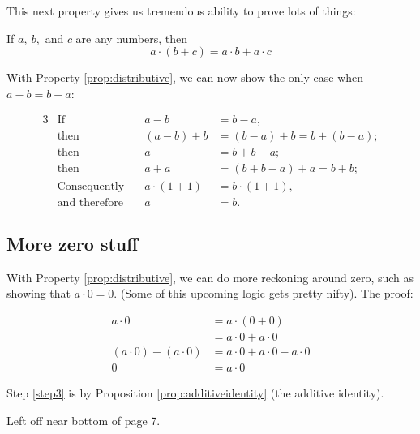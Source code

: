 This next property gives us tremendous ability to prove lots of things:

\begin{property}\label{prop:distributive}
    If $a,~b,$ and $c$ are any numbers, then 
    $$
    a \cdot (b + c) = a \cdot b + a \cdot c
    $$
\end{property}


With Property \ref{prop:distributive}, we can now show the only case when $a - b = b-a$:

\begin{alignat*}{3}
    &\text{If}\quad& a - b &= b - a, \\
    & \text{then}\quad& (a-b) + b &= (b-a) + b = b + (b-a);\\
    & \text{then}\quad& a &= b + b -a;\\
    & \text{then}\quad& a + a &= (b+b-a)+a = b+b;\\
    & \text{Consequently}\quad& a \cdot(1+1)&= b \cdot (1+1),\\
    &\text{and therefore}\quad& a &=b.
\end{alignat*}

\subsection{More zero stuff}

With Property \ref{prop:distributive}, we can do more reckoning around zero, such as
showing that $a \cdot 0 = 0$. (Some of this upcoming logic gets pretty nifty). The proof:

\begin{align}
    a \cdot 0 &= a \cdot (0+0) \label{step3} \\
              &= a\cdot0 + a \cdot 0\\
    (a\cdot 0) - (a \cdot 0) &= a \cdot 0 + a \cdot 0 - a \cdot 0\\
    0 &= a \cdot 0
\end{align}

Step \ref{step3} is by Proposition \ref{prop:additiveidentity} (the additive identity).

Left off near bottom of page 7.
